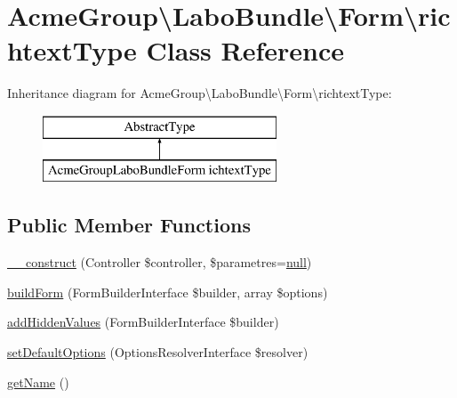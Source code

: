 \hypertarget{class_acme_group_1_1_labo_bundle_1_1_form_1_1richtext_type}{\section{Acme\+Group\textbackslash{}Labo\+Bundle\textbackslash{}Form\textbackslash{}richtext\+Type Class Reference}
\label{class_acme_group_1_1_labo_bundle_1_1_form_1_1richtext_type}
}
Inheritance diagram for Acme\+Group\textbackslash{}Labo\+Bundle\textbackslash{}Form\textbackslash{}richtext\+Type\+:\begin{figure}[H]
\begin{center}
\leavevmode
\includegraphics[height=2.000000cm]{class_acme_group_1_1_labo_bundle_1_1_form_1_1richtext_type}
\end{center}
\end{figure}
\subsection*{Public Member Functions}
\begin{DoxyCompactItemize}
\item 
\hyperlink{class_acme_group_1_1_labo_bundle_1_1_form_1_1richtext_type_a1c693f1823bd9857b1e3495e30ce91b9}{\+\_\+\+\_\+construct} (Controller \$controller, \$parametres=\hyperlink{validate_8js_afb8e110345c45e74478894341ab6b28e}{null})
\item 
\hyperlink{class_acme_group_1_1_labo_bundle_1_1_form_1_1richtext_type_a648355b3f0b6da6b8d726effd5ffc23f}{build\+Form} (Form\+Builder\+Interface \$builder, array \$options)
\item 
\hyperlink{class_acme_group_1_1_labo_bundle_1_1_form_1_1richtext_type_a49abc2e483a0bc57224697642400bde1}{add\+Hidden\+Values} (Form\+Builder\+Interface \$builder)
\item 
\hyperlink{class_acme_group_1_1_labo_bundle_1_1_form_1_1richtext_type_a538f951056a6926bc5b0884c72147bdd}{set\+Default\+Options} (Options\+Resolver\+Interface \$resolver)
\item 
\hyperlink{class_acme_group_1_1_labo_bundle_1_1_form_1_1richtext_type_a3baff3fe69e69742bf4158c69fe1d3fb}{get\+Name} ()
\end{DoxyCompactItemize}


